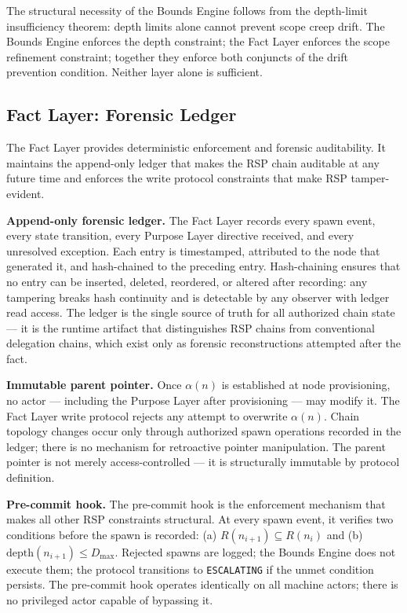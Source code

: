 The structural necessity of the Bounds Engine follows from the depth-limit insufficiency theorem: depth limits alone cannot prevent scope creep drift. The Bounds Engine enforces the depth constraint; the Fact Layer enforces the scope refinement constraint; together they enforce both conjuncts of the drift prevention condition. Neither layer alone is sufficient.

\subsection{Fact Layer: Forensic Ledger}
\label{sec:rs-fact-ledger}

The Fact Layer provides deterministic enforcement and forensic auditability. It maintains the append-only ledger that makes the RSP chain auditable at any future time and enforces the write protocol constraints that make RSP tamper-evident.

\medskip
\noindent\textbf{Append-only forensic ledger.} The Fact Layer records every spawn event, every state transition, every Purpose Layer directive received, and every unresolved exception. Each entry is timestamped, attributed to the node that generated it, and hash-chained to the preceding entry. Hash-chaining ensures that no entry can be inserted, deleted, reordered, or altered after recording: any tampering breaks hash continuity and is detectable by any observer with ledger read access. The ledger is the single source of truth for all authorized chain state — it is the runtime artifact that distinguishes RSP chains from conventional delegation chains, which exist only as forensic reconstructions attempted after the fact.

\medskip
\noindent\textbf{Immutable parent pointer.} Once $\alpha(n)$ is established at node provisioning, no actor — including the Purpose Layer after provisioning — may modify it. The Fact Layer write protocol rejects any attempt to overwrite $\alpha(n)$. Chain topology changes occur only through authorized spawn operations recorded in the ledger; there is no mechanism for retroactive pointer manipulation. The parent pointer is not merely access-controlled — it is structurally immutable by protocol definition.

\medskip
\noindent\textbf{Pre-commit hook.} The pre-commit hook is the enforcement mechanism that makes all other RSP constraints structural. At every spawn event, it verifies two conditions before the spawn is recorded: (a) $R(n_{i+1}) \subseteq R(n_i)$ and (b) $\mathrm{depth}(n_{i+1}) \leq D_{\mathrm{max}}$. Rejected spawns are logged; the Bounds Engine does not execute them; the protocol transitions to \texttt{ESCALATING} if the unmet condition persists. The pre-commit hook operates identically on all machine actors; there is no privileged actor capable of bypassing it.

